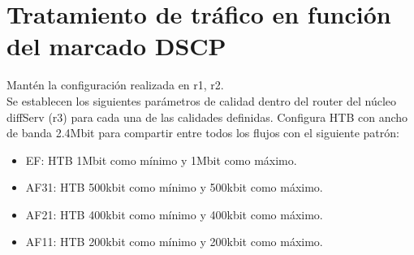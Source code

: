 \documentclass[12pt, a4paper]{report}
\begin{document}
\section{Tratamiento de tráfico en función del marcado DSCP}
Mantén la configuración realizada en r1, r2.\\

Se establecen los siguientes parámetros de calidad dentro del router del núcleo diffServ (r3) para
cada una de las calidades definidas. Configura HTB con ancho de banda 2.4Mbit para compartir entre
todos los flujos con el siguiente patrón:
\begin{itemize}
	\item EF: HTB 1Mbit como mínimo y 1Mbit como máximo.
	\item AF31: HTB 500kbit como mínimo y 500kbit como máximo.
	\item AF21: HTB 400kbit como mínimo y 400kbit como máximo.
	\item AF11: HTB 200kbit como mínimo y 200kbit como máximo.
\end{itemize}
\end{document}
